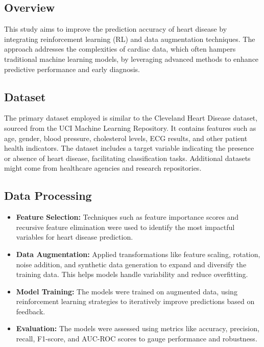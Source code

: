 \subsection*{Overview}
This study aims to improve the prediction accuracy of heart disease by integrating reinforcement learning (RL) and data augmentation techniques. The approach addresses the complexities of cardiac data, which often hampers traditional machine learning models, by leveraging advanced methods to enhance predictive performance and early diagnosis.

\subsection*{Dataset}
The primary dataset employed is similar to the Cleveland Heart Disease dataset, sourced from the UCI Machine Learning Repository. It contains features such as age, gender, blood pressure, cholesterol levels, ECG results, and other patient health indicators. The dataset includes a target variable indicating the presence or absence of heart disease, facilitating classification tasks. Additional datasets might come from healthcare agencies and research repositories.

\subsection*{Data Processing}
\begin{itemize}
    \item \textbf{Feature Selection:} Techniques such as feature importance scores and recursive feature elimination were used to identify the most impactful variables for heart disease prediction.
    \item \textbf{Data Augmentation:} Applied transformations like feature scaling, rotation, noise addition, and synthetic data generation to expand and diversify the training data. This helps models handle variability and reduce overfitting.
    \item \textbf{Model Training:} The models were trained on augmented data, using reinforcement learning strategies to iteratively improve predictions based on feedback.
    \item \textbf{Evaluation:} The models were assessed using metrics like accuracy, precision, recall, F1-score, and AUC-ROC scores to gauge performance and robustness.
\end{itemize}

